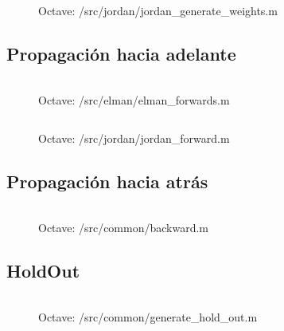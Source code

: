 \documentclass[10pt, a4paper,spanish]{article}
\begin{document}
			\begin{figure}[htpb!]
				\centering
				\inputminted{octave}{../src/jordan/jordan_generate_weights.m}
				\caption{Octave: /src/jordan/jordan\_generate\_weights.m}
				\label{code:jordan_generate_weights}
			\end{figure}


		\subsection{Propagación hacia adelante}
			\paragraph{}

			\begin{figure}[htpb!]
				\centering
				\inputminted{octave}{../src/elman/elman_forward.m}
				\caption{Octave: /src/elman/elman\_forwards.m}
				\label{code:elman_forward}
			\end{figure}

			\begin{figure}[htpb!]
				\centering
				\inputminted{octave}{../src/jordan/jordan_forward.m}
				\caption{Octave: /src/jordan/jordan\_forward.m}
				\label{code:jordan_forward}
			\end{figure}

		\subsection{Propagación hacia atrás}
			\paragraph{}

			\begin{figure}[htpb!]
				\centering
				\inputminted{octave}{../src/common/backward.m}
				\caption{Octave: /src/common/backward.m}
				\label{code:backward}
			\end{figure}


		\subsection{HoldOut}
			\paragraph{}


			\begin{figure}[htpb!]
				\centering
				\inputminted{octave}{../src/common/generate_hold_out.m}
				\caption{Octave: /src/common/generate\_hold\_out.m}
				\label{code:generate_hold_out}
			\end{figure}
\end{document}
